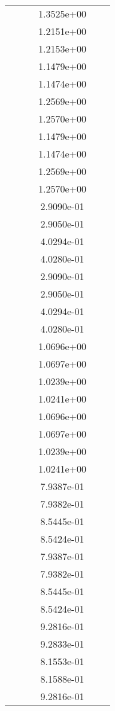 \begin{xltabular}{\textwidth}{r|rS[table-format=1.3e+2]S[table-format=1.4e+2]S[table-format=1.4e+2]S[table-format=-1.5]}
&  &  & 1.3525e+00 & & \\
&  &  & 1.2151e+00 & & \\
&  &  & 1.2153e+00 & & \\
&  &  & 1.1479e+00 & & \\
&  &  & 1.1474e+00 & & \\
&  &  & 1.2569e+00 & & \\
&  &  & 1.2570e+00 & & \\
&  &  & 1.1479e+00 & & \\
&  &  & 1.1474e+00 & & \\
&  &  & 1.2569e+00 & & \\
&  &  & 1.2570e+00 & & \\
&  &  & 2.9090e-01 & & \\
&  &  & 2.9050e-01 & & \\
&  &  & 4.0294e-01 & & \\
&  &  & 4.0280e-01 & & \\
&  &  & 2.9090e-01 & & \\
&  &  & 2.9050e-01 & & \\
&  &  & 4.0294e-01 & & \\
&  &  & 4.0280e-01 & & \\
&  &  & 1.0696e+00 & & \\
&  &  & 1.0697e+00 & & \\
&  &  & 1.0239e+00 & & \\
&  &  & 1.0241e+00 & & \\
&  &  & 1.0696e+00 & & \\
&  &  & 1.0697e+00 & & \\
&  &  & 1.0239e+00 & & \\
&  &  & 1.0241e+00 & & \\
&  &  & 7.9387e-01 & & \\
&  &  & 7.9382e-01 & & \\
&  &  & 8.5445e-01 & & \\
&  &  & 8.5424e-01 & & \\
&  &  & 7.9387e-01 & & \\
&  &  & 7.9382e-01 & & \\
&  &  & 8.5445e-01 & & \\
&  &  & 8.5424e-01 & & \\
&  &  & 9.2816e-01 & & \\
&  &  & 9.2833e-01 & & \\
&  &  & 8.1553e-01 & & \\
&  &  & 8.1588e-01 & & \\
&  &  & 9.2816e-01 & & \\

\end{xltabular}
